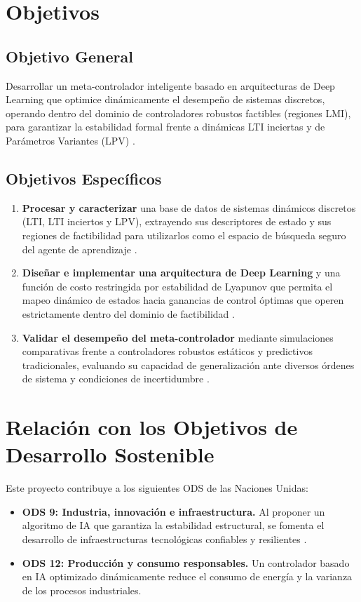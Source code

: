 \documentclass[12pt,twoside]{report}
\begin{document}
\section{Objetivos}
\subsection{Objetivo General}
Desarrollar un meta-controlador inteligente basado en arquitecturas de Deep Learning que optimice dinámicamente el desempeño de sistemas discretos, operando dentro del dominio de controladores robustos factibles (regiones LMI), para garantizar la estabilidad formal frente a dinámicas LTI inciertas y de Parámetros Variantes (LPV) \cite{boyd1994}.

\subsection{Objetivos Específicos}
\begin{enumerate}
    \item \textbf{Procesar y caracterizar} una base de datos de sistemas dinámicos discretos (LTI, LTI inciertos y LPV), extrayendo sus descriptores de estado y sus regiones de factibilidad para utilizarlos como el espacio de búsqueda seguro del agente de aprendizaje \cite{zhou1996}.
    
    \item \textbf{Diseñar e implementar una arquitectura de Deep Learning} y una función de costo restringida por estabilidad de Lyapunov que permita el mapeo dinámico de estados hacia ganancias de control óptimas que operen estrictamente dentro del dominio de factibilidad \cite{richards2018, amos2017}.
    
    \item \textbf{Validar el desempeño del meta-controlador} mediante simulaciones comparativas frente a controladores robustos estáticos y predictivos tradicionales, evaluando su capacidad de generalización ante diversos órdenes de sistema y condiciones de incertidumbre \cite{manek2019}.
\end{enumerate}

\section{Relación con los Objetivos de Desarrollo Sostenible}
Este proyecto contribuye a los siguientes ODS de las Naciones Unidas:
\begin{itemize}
    \item \textbf{ODS 9: Industria, innovación e infraestructura.} Al proponer un algoritmo de IA que garantiza la estabilidad estructural, se fomenta el desarrollo de infraestructuras tecnológicas confiables y resilientes \cite{stein2003}.
    \item \textbf{ODS 12: Producción y consumo responsables.} Un controlador basado en IA optimizado dinámicamente reduce el consumo de energía y la varianza de los procesos industriales.
\end{itemize}
\end{document}
